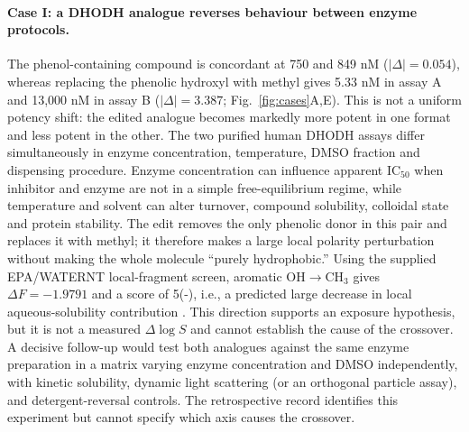 \documentclass[letterpaper]{article}
\begin{document}
\paragraph{Case I: a DHODH analogue reverses behaviour between enzyme protocols.}
The phenol-containing compound is concordant at 750 and 849 nM ($|\Delta|=0.054$), whereas replacing the phenolic hydroxyl with methyl gives 5.33 nM in assay A and 13,000 nM in assay B ($|\Delta|=3.387$; Fig.~\ref{fig:cases}A,E). This is not a uniform potency shift: the edited analogue becomes markedly more potent in one format and less potent in the other. The two purified human DHODH assays differ simultaneously in enzyme concentration, temperature, DMSO fraction and dispensing procedure. Enzyme concentration can influence apparent IC$_{50}$ when inhibitor and enzyme are not in a simple free-equilibrium regime, while temperature and solvent can alter turnover, compound solubility, colloidal state and protein stability. The edit removes the only phenolic donor in this pair and replaces it with methyl; it therefore makes a large local polarity perturbation without making the whole molecule ``purely hydrophobic.'' Using the supplied EPA/WATERNT local-fragment screen, aromatic OH$\rightarrow$CH$_3$ gives $\Delta F=-1.9791$ and a score of 5(-), i.e., a predicted large decrease in local aqueous-solubility contribution \citep{epa_waternt}. This direction supports an exposure hypothesis, but it is not a measured $\Delta\log S$ and cannot establish the cause of the crossover. A decisive follow-up would test both analogues against the same enzyme preparation in a matrix varying enzyme concentration and DMSO independently, with kinetic solubility, dynamic light scattering (or an orthogonal particle assay), and detergent-reversal controls. The retrospective record identifies this experiment but cannot specify which axis causes the crossover.
\end{document}
